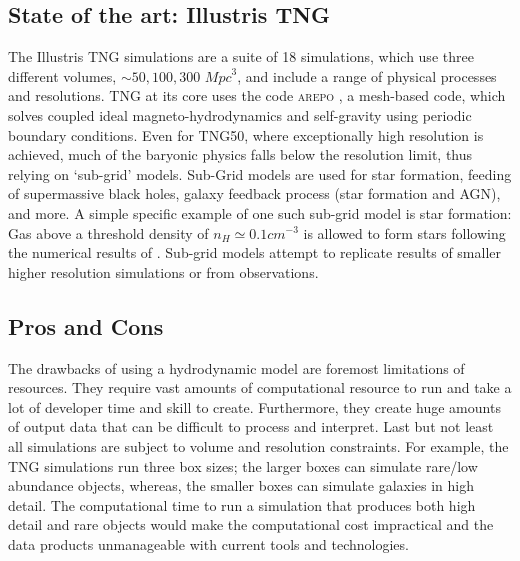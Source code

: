 \subsection{State of the art: Illustris TNG}
The Illustris TNG simulations are a suite of 18 simulations, which use three different volumes, $\sim 50, 100, 300$ ${Mpc}^{3}$, and include a range of physical processes and resolutions. TNG at its core uses the code \textsc{arepo} \citep{Springel2010EMesh}, a mesh-based code, which solves coupled ideal magneto-hydrodynamics and self-gravity using periodic boundary conditions. Even for TNG50, where exceptionally high resolution is achieved, much of the baryonic physics falls below the resolution limit, thus relying on `sub-grid' models. Sub-Grid models are used for star formation, feeding of supermassive black holes, galaxy feedback process (star formation and AGN), and more. A simple specific example of one such sub-grid model is star formation: Gas above a threshold density of $n_H \simeq 0.1cm^{-3}$ is allowed to form stars following the numerical results of \citet{Springel2003CosmologicalFormation}. Sub-grid models attempt to replicate results of smaller higher resolution simulations or from observations. 

\subsection{Pros and Cons}
The drawbacks of using a hydrodynamic model are foremost limitations of resources. They require vast amounts of computational resource to run and take a lot of developer time and skill to create. Furthermore, they create huge amounts of output data that can be difficult to process and interpret. Last but not least all simulations are subject to volume and resolution constraints. For example, the TNG simulations run three box sizes; the larger boxes can simulate rare/low abundance objects, whereas, the smaller boxes can simulate galaxies in high detail. The computational time to run a simulation that produces both high detail and rare objects would make the computational cost impractical and the data products unmanageable with current tools and technologies. 

